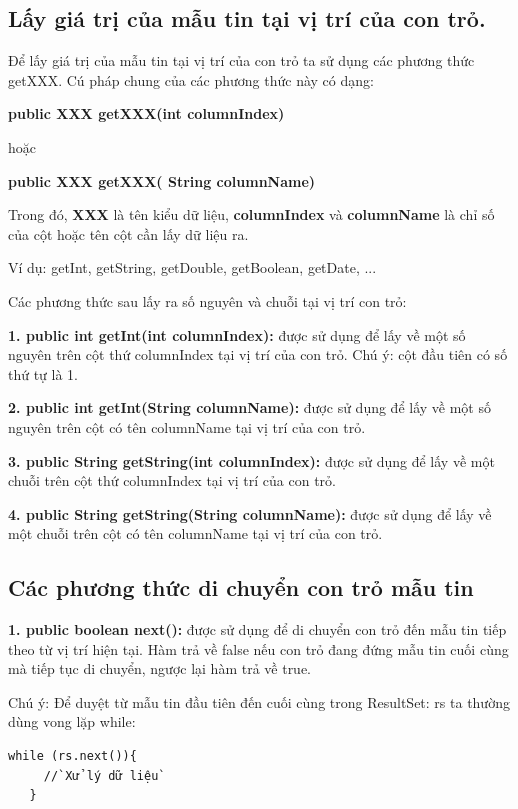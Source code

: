 \subsection{Lấy giá trị của mẫu tin tại vị trí của con trỏ.}
Để lấy giá trị của mẫu tin tại vị trí của con trỏ ta sử dụng các phương thức getXXX. Cú pháp chung của các phương thức này có dạng:
\begin{center}
	 \textbf{public XXX getXXX(int columnIndex)} 
\end{center}
hoặc
\begin{center}
	 \textbf{public XXX getXXX( String columnName)} 
\end{center}

Trong đó, \textbf{XXX} là tên kiểu dữ liệu, \textbf{columnIndex} và \textbf{columnName} là chỉ số của cột hoặc tên cột cần lấy dữ liệu ra. 

Ví dụ: getInt, getString, getDouble, getBoolean, getDate,  ... 

Các phương thức sau lấy ra số nguyên và chuỗi tại vị trí con trỏ:

\textbf{1. public int getInt(int columnIndex):}	được sử dụng để lấy về một số nguyên trên cột thứ columnIndex tại vị trí của con trỏ. Chú ý: cột đầu tiên có số thứ tự là 1.

\textbf{2. public int getInt(String columnName):} được sử dụng để lấy về một số nguyên trên cột có tên columnName tại vị trí của con trỏ.

\textbf{3. public String getString(int columnIndex):}	được sử dụng để lấy về một chuỗi trên cột thứ columnIndex tại vị trí của con trỏ.

\textbf{4. public String getString(String columnName):}	được sử dụng để lấy về một chuỗi trên cột có tên columnName tại vị trí của con trỏ.

\subsection{Các phương thức di chuyển con trỏ mẫu tin}

\textbf{1. public boolean next():}	được sử dụng để di chuyển con trỏ đến mẫu tin tiếp theo từ vị trí hiện tại. Hàm trả về false nếu con trỏ đang đứng mẫu tin cuối cùng mà tiếp tục di chuyển, ngược lại hàm trả về true.

Chú ý: Để duyệt từ mẫu tin đầu tiên đến cuối cùng trong ResultSet: rs ta thường dùng vong lặp while:
\begin{lstlisting}[escapechar=`]
   while (rs.next()){
     //`Xử lý dữ liệu`
   }

\end{lstlisting}

